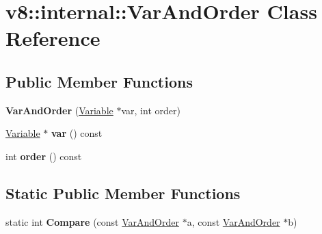 \hypertarget{classv8_1_1internal_1_1_var_and_order}{}\section{v8\+:\+:internal\+:\+:Var\+And\+Order Class Reference}
\label{classv8_1_1internal_1_1_var_and_order}
\subsection*{Public Member Functions}
\begin{DoxyCompactItemize}
\item 
{\bfseries Var\+And\+Order} (\hyperlink{classv8_1_1internal_1_1_variable}{Variable} $\ast$var, int order)\hypertarget{classv8_1_1internal_1_1_var_and_order_ad43de731abbef8100cc41064fda838b4}{}\label{classv8_1_1internal_1_1_var_and_order_ad43de731abbef8100cc41064fda838b4}

\item 
\hyperlink{classv8_1_1internal_1_1_variable}{Variable} $\ast$ {\bfseries var} () const \hypertarget{classv8_1_1internal_1_1_var_and_order_adaa15744d60f0adbe432baed1e0e69c7}{}\label{classv8_1_1internal_1_1_var_and_order_adaa15744d60f0adbe432baed1e0e69c7}

\item 
int {\bfseries order} () const \hypertarget{classv8_1_1internal_1_1_var_and_order_a97c3d6eb71fd5c6a23b5df80cc53a9c8}{}\label{classv8_1_1internal_1_1_var_and_order_a97c3d6eb71fd5c6a23b5df80cc53a9c8}

\end{DoxyCompactItemize}
\subsection*{Static Public Member Functions}
\begin{DoxyCompactItemize}
\item 
static int {\bfseries Compare} (const \hyperlink{classv8_1_1internal_1_1_var_and_order}{Var\+And\+Order} $\ast$a, const \hyperlink{classv8_1_1internal_1_1_var_and_order}{Var\+And\+Order} $\ast$b)\hypertarget{classv8_1_1internal_1_1_var_and_order_a21508ec7f6ed8ba56ca6b9f88cb3b0e5}{}\label{classv8_1_1internal_1_1_var_and_order_a21508ec7f6ed8ba56ca6b9f88cb3b0e5}

\end{DoxyCompactItemize}
